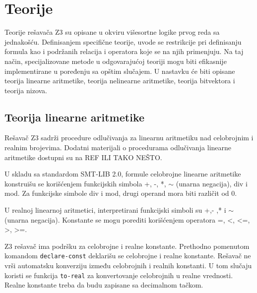 \documentclass[12pt,oneside]{memoir}
\begin{document}
\section{Teorije} \label{sec:num2}
Teorije rešavača Z3 su opisane u okviru višesortne logike prvog reda sa jednakošću.  Definisanjem specifične teorije, uvode se restrikcije pri definisanju formula kao i podržanih relacija i operatora koje se na njih primenjuju. Na taj način, specijalizovane metode u odgovarajućoj teoriji mogu biti efikasnije implementirane u poređenju sa opštim slučajem. U nastavku će biti opisane teorija linearne aritmetike, teorija nelinearne aritmetike, teorija bitvektora i teorija nizova.

\subsection{Teorija linearne aritmetike} 

Rešavač Z3 sadrži procedure odlučivanja za linearnu aritmetiku nad celobrojnim i realnim brojevima. Dodatni materijali o procedurama odlučivanja linearne aritmetike dostupni su na REF ILI TAKO NEŠTO.
\par

U skladu sa standardom SMT-LIB 2.0, formule celobrojne linearne aritmetike konstruišu se korišćenjem funkcijskih simbola +, -, *, $\sim$ (unarna negacija), div i mod. Za funkcijske simbole div i mod, drugi operand mora biti različit od 0. 



U realnoj linearnoj aritmetici, interpretirani funkcijski simboli su +,- ,* i $\sim$(unarna negacija). Konstante se mogu porediti korišćenjem operatora =, <, <=, >, >=. 
\\
\par
Z3 rešavač ima podršku za celobrojne i realne konstante. Prethodno pomenutom komandom \texttt{declare-const} deklarišu se celobrojne i realne konstante. Rešavač ne vrši automatsku konverziju između celobrojnih i realnih konstanti. U tom slučaju koristi se funkcija \texttt{to-real} za konvertovanje celobrojnih u realne vrednosti.
Realne konstante treba da budu zapisane sa decimalnom tačkom.
\end{document}

